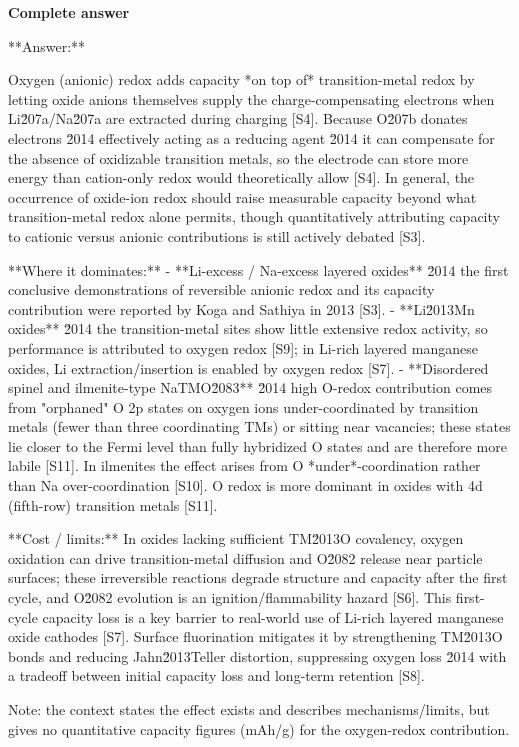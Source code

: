 \documentclass[10pt]{article}
\begin{document}
\textbf{Complete answer}
\begin{AnswerText}
**Answer:**

Oxygen (anionic) redox adds capacity *on top of* transition-metal redox by letting oxide anions themselves supply the charge-compensating electrons when Li\u207a/Na\u207a are extracted during charging [S4]. Because O\u207b donates electrons \u2014 effectively acting as a reducing agent \u2014 it can compensate for the absence of oxidizable transition metals, so the electrode can store more energy than cation-only redox would theoretically allow [S4]. In general, the occurrence of oxide-ion redox should raise measurable capacity beyond what transition-metal redox alone permits, though quantitatively attributing capacity to cationic versus anionic contributions is still actively debated [S3].

**Where it dominates:**
- **Li-excess / Na-excess layered oxides** \u2014 the first conclusive demonstrations of reversible anionic redox and its capacity contribution were reported by Koga and Sathiya in 2013 [S3].
- **Li\u2013Mn oxides** \u2014 the transition-metal sites show little extensive redox activity, so performance is attributed to oxygen redox [S9]; in Li-rich layered manganese oxides, Li extraction/insertion is enabled by oxygen redox [S7].
- **Disordered spinel and ilmenite-type NaTMO\u2083** \u2014 high O-redox contribution comes from "orphaned" O 2p states on oxygen ions under-coordinated by transition metals (fewer than three coordinating TMs) or sitting near vacancies; these states lie closer to the Fermi level than fully hybridized O states and are therefore more labile [S11]. In ilmenites the effect arises from O *under*-coordination rather than Na over-coordination [S10]. O redox is more dominant in oxides with 4d (fifth-row) transition metals [S11].

**Cost / limits:** In oxides lacking sufficient TM\u2013O covalency, oxygen oxidation can drive transition-metal diffusion and O\u2082 release near particle surfaces; these irreversible reactions degrade structure and capacity after the first cycle, and O\u2082 evolution is an ignition/flammability hazard [S6]. This first-cycle capacity loss is a key barrier to real-world use of Li-rich layered manganese oxide cathodes [S7]. Surface fluorination mitigates it by strengthening TM\u2013O bonds and reducing Jahn\u2013Teller distortion, suppressing oxygen loss \u2014 with a tradeoff between initial capacity loss and long-term retention [S8].

Note: the context states the effect exists and describes mechanisms/limits, but gives no quantitative capacity figures (mAh/g) for the oxygen-redox contribution.
\end{AnswerText}
\end{document}
